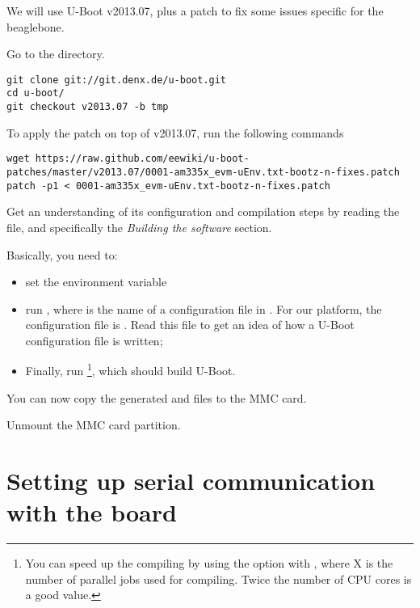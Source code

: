 We will use U-Boot v2013.07, plus a patch to fix some issues specific for the beaglebone.

Go to the  directory.

\begin{verbatim}
git clone git://git.denx.de/u-boot.git
cd u-boot/
git checkout v2013.07 -b tmp
\end{verbatim}

To apply the patch on top of v2013.07, run the following commands

\begin{verbatim}
wget https://raw.github.com/eewiki/u-boot-patches/master/v2013.07/0001-am335x_evm-uEnv.txt-bootz-n-fixes.patch
patch -p1 < 0001-am335x_evm-uEnv.txt-bootz-n-fixes.patch
\end{verbatim}


Get an understanding of its configuration and compilation steps by
reading the  file, and specifically the {\em Building the
  software} section.

Basically, you need to:

\begin{itemize}

\item set the  environment variable

\item run , where  is the name
  of a configuration file in . For our
  platform, the configuration file is
  . Read this file to get an idea of
  how a U-Boot configuration file is written;

\item Finally, run \footnote{You can speed up the compiling
  by using the  option with , where X is the number of parallel
  jobs used for compiling. Twice the number of CPU cores is a good
  value.}, which should build U-Boot.

\end{itemize}

You can now copy the generated  and  files to the MMC card.

Unmount the MMC card partition.

\section{Setting up serial communication with the board}

